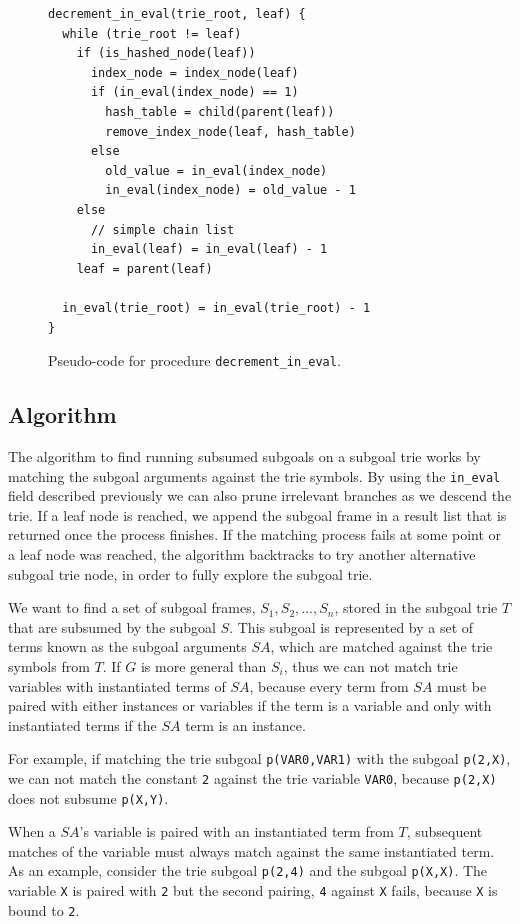 \begin{figure}[ht]
\begin{Verbatim}
decrement_in_eval(trie_root, leaf) {
  while (trie_root != leaf)
    if (is_hashed_node(leaf))
      index_node = index_node(leaf)
      if (in_eval(index_node) == 1)
        hash_table = child(parent(leaf))
        remove_index_node(leaf, hash_table)
      else
        old_value = in_eval(index_node)
        in_eval(index_node) = old_value - 1
    else
      // simple chain list
      in_eval(leaf) = in_eval(leaf) - 1
    leaf = parent(leaf)
    
  in_eval(trie_root) = in_eval(trie_root) - 1
}
\end{Verbatim}
\caption{Pseudo-code for procedure \texttt{decrement\_in\_eval}.}
\label{fig:decrement_in_eval}
\end{figure}

\subsection{Algorithm}

The algorithm to find running subsumed subgoals on a subgoal trie works by
matching the subgoal arguments against the trie symbols. By using the
\texttt{in\_eval} field described previously we can also prune irrelevant
branches as we descend the trie. If a leaf node is reached, we append the subgoal
frame in a result list that is returned once the process finishes. If the matching process
fails at some point or a leaf node was reached, the algorithm backtracks to try another
alternative subgoal trie node, in order to fully explore the subgoal trie.

We want to find a set of subgoal frames, $S_1, S_2, ..., S_n$, stored in the subgoal trie $T$ that
are subsumed by the subgoal $S$. This subgoal is represented by a set of terms known as the
subgoal arguments $SA$, which are matched against the trie symbols from $T$. If $G$
is more general than $S_i$, thus we can not match trie variables with instantiated terms of
$SA$, because every term from $SA$ must be paired with either instances or variables if the term
is a variable and only with instantiated terms if the $SA$ term is an instance.

For example, if matching the trie subgoal \texttt{p(VAR0,VAR1)} with the subgoal \texttt{p(2,X)}, we
can not match the constant \texttt{2} against the trie variable \texttt{VAR0},
because \texttt{p(2,X)} does not subsume \texttt{p(X,Y)}.

When a $SA$'s variable is paired with an instantiated term from $T$, subsequent matches of
the variable must always match against the same instantiated term. As an example, consider
the trie subgoal \texttt{p(2,4)} and the subgoal \texttt{p(X,X)}. The variable \texttt{X}
is paired with \texttt{2} but the second pairing, \texttt{4} against \texttt{X} fails, because
\texttt{X} is bound to \texttt{2}.

